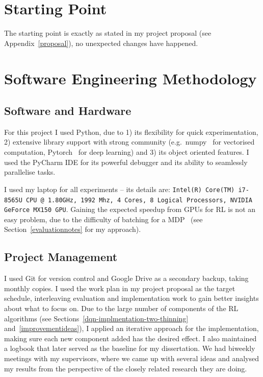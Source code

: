 \section{Starting Point}

The starting point is exactly as stated in my project proposal (see Appendix~\ref{proposal}), no unexpected changes have happened.


\section{Software Engineering Methodology}


\subsection{Software and Hardware}


For this project I used Python, due to 1) its flexibility for quick experimentation, 2) extensive library support with strong community (e.g.\ numpy~\cite{harris2020numpy} for vectorised computation, Pytorch~\cite{paszke2019pytorch} for deep learning) and 3) its object oriented features. I used the PyCharm IDE for its powerful debugger and its ability to seamlessly parallelise tasks.


I used my laptop for all experiments -- its details are: \texttt{Intel(R) Core(TM) i7-8565U CPU @ 1.80GHz, 1992 Mhz, 4 Cores, 8 Logical Processors, NVIDIA GeForce MX150 GPU}. Gaining the expected speedup from GPUs for RL is not an easy problem, due to the difficulty of batching for a MDP~\cite{stooke2018gpudeepRL} (see Section~\ref{evaluationnotes} for my approach).


\subsection{Project Management}

I used Git for version control and Google Drive as a secondary backup, taking monthly copies. I used the work plan in my project proposal as the target schedule, interleaving evaluation and implementation work to gain better insights about what to focus on. Due to the large number of components of the RL algorithms (see Sections~\ref{dqn-implmentation-two-thinning} and~\ref{improvementideas}), I applied an iterative approach for the implementation, making sure each new component added has the desired effect. I also maintained a logbook that later served as the baseline for my dissertation. We had biweekly meetings with my supervisors, where we came up with several ideas and analysed my results from the perspective of the closely related research they are doing.

